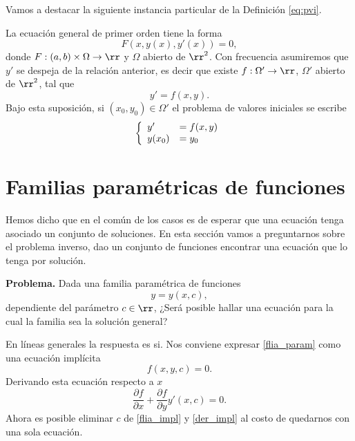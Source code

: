  Vamos a destacar la siguiente instancia particular de la Definición \ref{eq:pvi}.


\begin{definicion}{} La ecuación general de primer orden tiene la forma
\[
F(x,y(x),y'(x))=0,
\]
donde $F:(a,b)\times \Omega\to\rr$ y $\Omega$ abierto de $\rr^2$. Con frecuencia asumiremos que $y'$ se despeja de la relación anterior, es decir que existe $f:\Omega'\to\rr$,
$\Omega'$ abierto de $\rr^2$, tal que
\[y'=f(x,y).\]
Bajo esta suposición, si $(x_0,y_0)\in\Omega'$ el problema de valores iniciales se escribe
\[\left\{\begin{array}{l l}
	    y'&=f(x,y)\\
	    y(x_0)&=y_0
         \end{array}\right.
\]
\end{definicion}



\section{Familias paramétricas de funciones}

Hemos dicho que en el común de los casos es de esperar que una
ecuación tenga asociado un conjunto de soluciones. En esta sección vamos a preguntarnos sobre el problema inverso, dao un conjunto de funciones encontrar una ecuación que lo tenga por solución.



\begin{mdframed}[style=MiEstilo]\relax%
\textbf{Problema. }
Dada una familia paramétrica de funciones
 \begin{equation}\label{flia_param}y=y(x,c),\end{equation}
 dependiente del parámetro $c\in\rr$, ¿Será posible hallar una ecuación para la cual la familia sea la solución general?
\end{mdframed}

En líneas generales la respuesta es si. Nos conviene expresar \eqref{flia_param} como una ecuación implícita
\begin{equation}\label{flia_impl}f(x,y,c)=0.\end{equation}
Derivando esta ecuación respecto a $x$
\begin{equation}\label{der_impl}
 \frac{\partial f}{\partial x}+\frac{\partial f}{\partial y}y'(x,c)=0.
\end{equation}
Ahora es posible eliminar $c$ de \eqref{flia_impl} y \eqref{der_impl} al costo de quedarnos con una sola ecuación.




